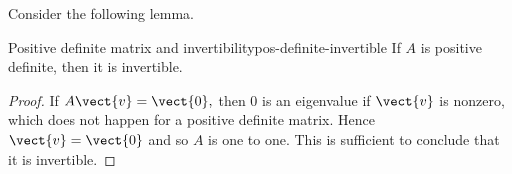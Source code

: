 
Consider the following lemma.

\begin{lemma}{Positive definite matrix and invertibility}{pos-definite-invertible}
If $A$ is positive definite, then it is invertible.
\end{lemma}

\begin{proof}
If $A\vect{v}=\vect{0},$ then $0$ is an eigenvalue if $\vect{v}$ is nonzero, which
does not happen for a positive definite matrix. Hence $\vect{v}=\vect{0}$ and
so $A$ is one to one. This is sufficient to conclude that it is invertible.
\end{proof}

